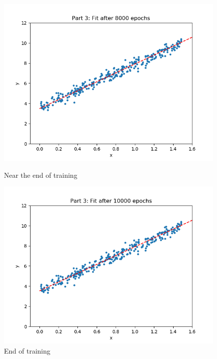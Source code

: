 \documentclass[paper=a4, fontsize=11pt]{scrartcl} %
\numberwithin{equation}{section} %
\numberwithin{figure}{section} %
\numberwithin{table}{section} %
\begin{document}
\begin{figure}[H]
    \includegraphics[width=\linewidth]{q2p35.png}
    \caption{Near the end of training}
    \label{fig:q2p35}
    \includegraphics[width=\linewidth]{q2p36.png}
    \caption{End of training}
    \label{fig:q2p36}
\end{figure}
\end{document}
